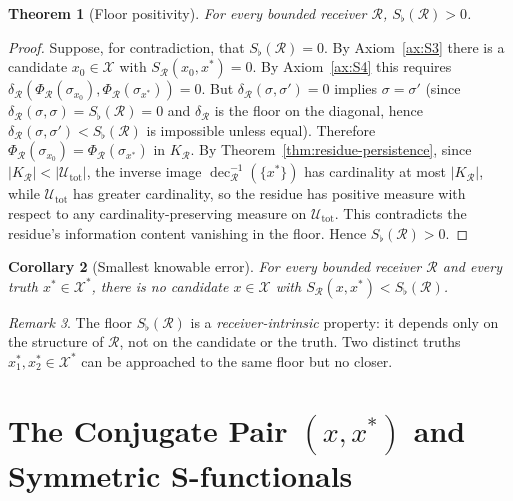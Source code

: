 \documentclass[twocolumn,11pt,a4paper]{article}
\theoremstyle{thmstyle}
\newtheorem{theorem}{Theorem}[section]
\newtheorem{corollary}[theorem]{Corollary}
\theoremstyle{thmstyle}
\theoremstyle{definition}
\theoremstyle{remark}
\newtheorem{remark}[theorem]{Remark}
\DeclareMathOperator{\dec}{dec}
\newcommand{\Cands}{\mathcal{X}}
\newcommand{\Truth}{\mathcal{X}^{*}}
\newcommand{\Sub}{\mathcal{U}}
\newcommand{\receiver}{\mathcal{R}}
\newcommand{\Sscalar}{S}
\newcommand{\Sfloor}{S_{\flat}}
\begin{document}
\begin{theorem}[Floor positivity]\label{thm:floor-positivity}
\label{sec:floor-theorem}
For every bounded receiver $\receiver$,
$\Sfloor(\receiver) > 0$.
\end{theorem}

\begin{proof}
Suppose, for contradiction, that
$\Sfloor(\receiver) = 0$.  By
Axiom~\ref{ax:S3} there is a candidate
$x_{0} \in \Cands$ with
$\Sscalar_{\receiver}(x_{0}, x^{*}) = 0$.  By
Axiom~\ref{ax:S4} this requires
$\delta_{\receiver}(\Phi_{\receiver}(\sigma_{x_{0}}),
                    \Phi_{\receiver}(\sigma_{x^{*}})) = 0$.
But $\delta_{\receiver}(\sigma, \sigma') = 0$ implies
$\sigma = \sigma'$ (since
$\delta_{\receiver}(\sigma,\sigma) = \Sfloor(\receiver) = 0$
and $\delta_{\receiver}$ is the floor on the diagonal,
hence $\delta_{\receiver}(\sigma,\sigma') < \Sfloor(\receiver)$
is impossible unless equal). Therefore
$\Phi_{\receiver}(\sigma_{x_{0}}) =
\Phi_{\receiver}(\sigma_{x^{*}})$ in $K_{\receiver}$.
By Theorem~\ref{thm:residue-persistence}, since
$|K_{\receiver}| < |\Sub_{\mathrm{tot}}|$, the inverse image
$\dec_{\receiver}^{-1}(\{x^{*}\})$ has cardinality at most
$|K_{\receiver}|$, while $\Sub_{\mathrm{tot}}$ has greater
cardinality, so the residue has positive measure with
respect to any cardinality-preserving measure on
$\Sub_{\mathrm{tot}}$.  This contradicts the residue's
information content vanishing in the floor.  Hence
$\Sfloor(\receiver) > 0$.
\end{proof}

\begin{corollary}[Smallest knowable error]\label{cor:smallest-knowable}
For every bounded receiver $\receiver$ and every truth
$x^{*} \in \Truth$, there is no candidate $x \in \Cands$
with $\Sscalar_{\receiver}(x, x^{*}) < \Sfloor(\receiver)$.
\end{corollary}

\begin{remark}\label{rem:floor-as-receiver-property}
The floor $\Sfloor(\receiver)$ is a \emph{receiver-intrinsic}
property: it depends only on the structure of $\receiver$,
not on the candidate or the truth.  Two distinct truths
$x_{1}^{*}, x_{2}^{*} \in \Truth$ can be approached
to the same floor but no closer.
\end{remark}

\section{The Conjugate Pair $(x, x^{*})$ and Symmetric S-functionals}
\label{sec:conjugate-pair}
\end{document}
